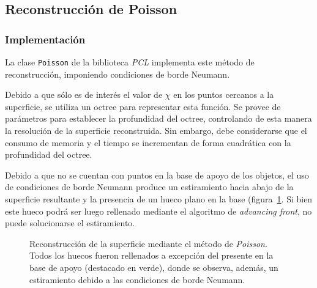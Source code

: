 	\subsection{Reconstrucción de Poisson}
	\subsubsection{Implementación}
	La clase \texttt{Poisson} de la biblioteca \emph{PCL} implementa este método de reconstrucción,
	imponiendo condiciones de borde Neumann.

	Debido a que sólo es de interés el valor de $\chi$ en los puntos cercanos a
	la superficie, se utiliza un octree para representar esta función. Se
	provee de parámetros para establecer la profundidad del octree, controlando
	de esta manera la resolución de la superficie reconstruida.
	Sin embargo, debe considerarse que el consumo de memoria y el tiempo se incrementan de forma
	cuadrática con la profundidad del octree.

	Debido a que no se cuentan con puntos en la base de apoyo de los objetos,
	el uso de condiciones de borde Neumann
	produce un estiramiento hacia abajo de la superficie resultante y la presencia de
	un hueco plano en la base (figura~\ref{fig:fill_poisson}.
	Si bien este hueco podrá ser luego rellenado mediante el algoritmo de \emph{advancing front},
	no puede solucionarse el estiramiento.



	\begin{figure}
		\caption{\label{fig:fill_poisson}Reconstrucción de la superficie mediante el método de \emph{Poisson}. Todos los huecos fueron rellenados a excepción del presente en la base de apoyo (destacado en verde), donde se observa, además, un estiramiento debido a las condiciones de borde Neumann.}
	\end{figure}

